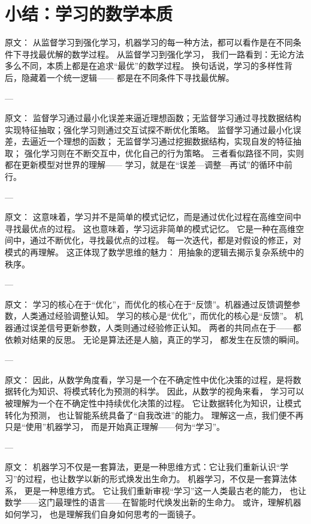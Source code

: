 \section{小结：学习的数学本质}

原文：
从监督学习到强化学习，机器学习的每一种方法，都可以看作是在不同条件下寻找最优解的数学过程。
从监督学习到强化学习，  
我们一路看到：无论方法多么不同，本质上都是在追求“最优”的数学过程。  
换句话说，学习的多样性背后，隐藏着一个统一逻辑——  
都是在不同条件下寻找最优解。

---

原文：
监督学习通过最小化误差来逼近理想函数；无监督学习通过寻找数据结构实现特征抽取；强化学习则通过交互试探不断优化策略。
监督学习通过最小化误差，去逼近一个理想的函数；  
无监督学习通过挖掘数据结构，实现自发的特征抽取；  
强化学习则在不断交互中，优化自己的行为策略。  
三者看似路径不同，实则都在更新模型对世界的理解——  
学习，就是在“误差—调整—再试”的循环中前行。

---

原文：
这意味着，学习并不是简单的模式记忆，而是通过优化过程在高维空间中寻找最优点的过程。
这也意味着，学习远非简单的模式记忆。  
它是一种在高维空间中，通过不断优化，寻找最优点的过程。  
每一次迭代，都是对假设的修正，对模式的再理解。  
这正体现了数学思维的魅力：  
用抽象的逻辑去揭示复杂系统中的秩序。

---

原文：
学习的核心在于“优化”，而优化的核心在于“反馈”。机器通过反馈调整参数，人类通过经验调整认知。
学习的核心是“优化”，而优化的核心是“反馈”。  
机器通过误差信号更新参数，人类则通过经验修正认知。  
两者的共同点在于——都依赖对结果的反思。  
无论是算法还是人脑，真正的学习，  
都发生在反馈的瞬间。

---

原文：
因此，从数学角度看，学习是一个在不确定性中优化决策的过程，是将数据转化为知识、将模式转化为预测的科学。
因此，从数学的视角来看，  
学习可以被理解为一个在不确定性中持续优化决策的过程。  
它让数据转化为知识，让模式转化为预测，  
也让智能系统具备了“自我改进”的能力。  
理解这一点，我们便不再只是“使用”机器学习，  
而是开始真正理解——何为“学习”。

---

原文：
机器学习不仅是一套算法，更是一种思维方式：它让我们重新认识“学习”的过程，也让数学以新的形式焕发出生命力。
机器学习，不仅是一套算法体系，  
更是一种思维方式。  
它让我们重新审视“学习”这一人类最古老的能力，  
也让数学——这门最理性的语言——在智能时代焕发出新的生命力。  
或许，理解机器如何学习，  
也是理解我们自身如何思考的一面镜子。


\nocite{*}
\newpage

